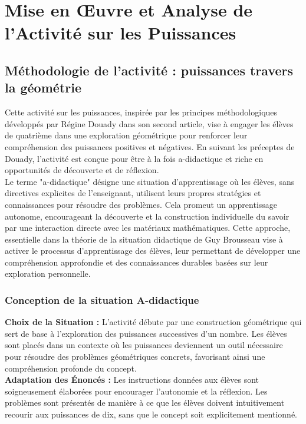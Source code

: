 \section{Mise en Œuvre et Analyse de l'Activité sur les Puissances}

\subsection{Méthodologie de l'activité : puissances travers la géométrie}

Cette activité sur les puissances,
inspirée par les principes méthodologiques développés par Régine Douady dans son second article,
vise à engager les élèves de quatrième dans une exploration géométrique pour renforcer leur compréhension des puissances positives et négatives.
En suivant les préceptes de Douady,
l'activité est conçue pour être à la fois a-didactique et riche en opportunités de découverte et de réflexion.\\

Le terme "a-didactique" désigne une situation d'apprentissage où les élèves,
sans directives explicites de l'enseignant,
utilisent leurs propres stratégies et connaissances pour résoudre des problèmes.
Cela promeut un apprentissage autonome,
encourageant la découverte et la construction individuelle du savoir par une interaction directe avec les matériaux mathématiques.
Cette approche,
essentielle dans la théorie de la situation didactique de Guy Brousseau \cite{brousseau}
vise à activer le processus d'apprentissage des élèves,
leur permettant de développer une compréhension approfondie et des connaissances durables basées sur leur exploration personnelle.

\subsubsection{Conception de la situation A-didactique}

\textbf{Choix de la Situation :}
L'activité débute par une construction géométrique qui sert de base à l'exploration des puissances successives d'un nombre.
Les élèves sont placés dans un contexte où les puissances deviennent un outil nécessaire pour résoudre des problèmes géométriques concrets,
favorisant ainsi une compréhension profonde du concept.\\

\textbf{Adaptation des Énoncés :}
Les instructions données aux élèves sont soigneusement élaborées pour encourager l'autonomie et la réflexion.
Les problèmes sont présentés de manière à ce que les élèves doivent intuitivement recourir aux puissances de dix,
sans que le concept soit explicitement mentionné.

